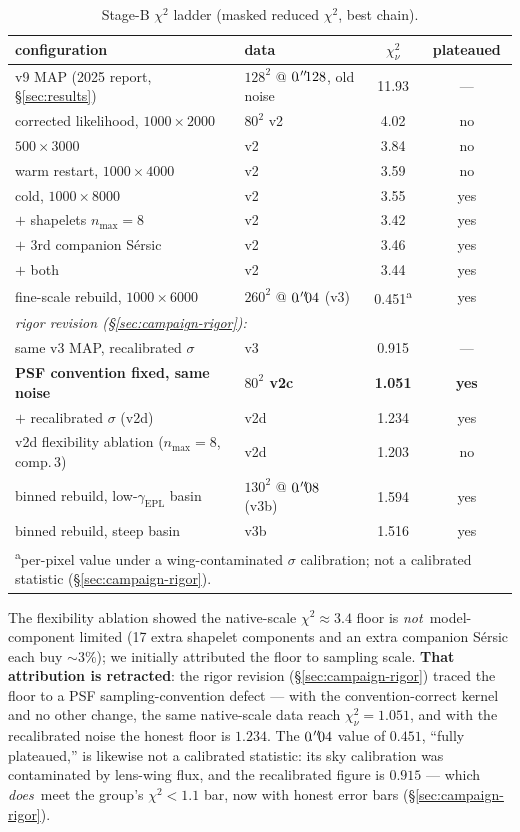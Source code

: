 \documentclass[11pt,letterpaper]{article}
\newcommand{\gammaEPL}{\ensuremath{\gamma_{\mathrm{EPL}}}}
\begin{document}
\begin{table}[ht]
\centering
\caption{Stage-B $\chi^{2}$ ladder (masked reduced $\chi^{2}$, best chain).}
\label{tab:chi2ladder}
\begin{tabular}{llcc}
\hline
configuration & data & $\chi^{2}_{\nu}$ & plateaued \\
\hline
v9 MAP (2025 report, \S\ref{sec:results}) & $128^2$ @ $0\mbox{$\!\!\,.{}^{\prime\prime}\!\!\,$}128$, old noise & 11.93 & --- \\
corrected likelihood, $1000\times2000$ & $80^2$ v2 & 4.02 & no \\
$500\times3000$ & v2 & 3.84 & no \\
warm restart, $1000\times4000$ & v2 & 3.59 & no \\
cold, $1000\times8000$ & v2 & 3.55 & yes \\
$+$ shapelets $n_{\max}{=}8$ & v2 & 3.42 & yes \\
$+$ 3rd companion S\'{e}rsic & v2 & 3.46 & yes \\
$+$ both & v2 & 3.44 & yes \\
fine-scale rebuild, $1000\times6000$ & $260^2$ @ $0\mbox{$\!\!\,.{}^{\prime\prime}\!\!\,$}04$ (v3) & 0.451\textsuperscript{a} & yes \\
\hline
\multicolumn{4}{l}{\it rigor revision (\S\ref{sec:campaign-rigor}):}\\
same v3 MAP, recalibrated $\sigma$ & v3 & 0.915 & --- \\
{\bf PSF convention fixed, same noise} & {\bf $80^2$ v2c} & {\bf 1.051} & {\bf yes} \\
$+$ recalibrated $\sigma$ (v2d) & v2d & 1.234 & yes \\
v2d flexibility ablation ($n_{\max}{=}8$, comp.\,3) & v2d & 1.203 & no \\
binned rebuild, low-$\gammaEPL$ basin & $130^2$ @ $0\mbox{$\!\!\,.{}^{\prime\prime}\!\!\,$}08$ (v3b) & 1.594 & yes \\
binned rebuild, steep basin & v3b & 1.516 & yes \\
\hline
\multicolumn{4}{l}{\footnotesize \textsuperscript{a}per-pixel value
under a wing-contaminated $\sigma$ calibration; not a calibrated
statistic (\S\ref{sec:campaign-rigor}).}\\
\end{tabular}
\end{table}

The flexibility ablation showed the native-scale $\chi^{2}\approx3.4$
floor is {\it not}\ model-component limited (17 extra shapelet
components and an extra companion S\'{e}rsic each buy $\sim$3\%); we
initially attributed the floor to sampling scale. {\bf That attribution
is retracted}: the rigor revision (\S\ref{sec:campaign-rigor}) traced
the floor to a PSF sampling-convention defect --- with the
convention-correct kernel and no other change, the same native-scale
data reach $\chi^{2}_{\nu}=1.051$, and with the recalibrated noise the
honest floor is $1.234$. The $0\mbox{$\!\!\,.{}^{\prime\prime}\!\!\,$}04$ value of $0.451$, ``fully
plateaued,'' is likewise not a calibrated statistic: its sky
calibration was contaminated by lens-wing flux, and the recalibrated
figure is $0.915$ --- which {\it does}\ meet the group's
$\chi^{2}<1.1$ bar, now with honest error bars
(\S\ref{sec:campaign-rigor}).
\end{document}
